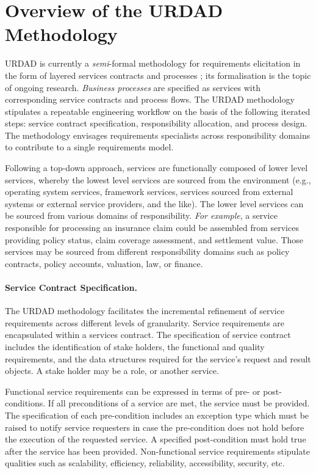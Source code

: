 \section{Overview of the URDAD Methodology 
\label{sec:urdadMethodology}}

URDAD is currently a \emph{semi}-formal methodology for requirements elicitation in the form of layered services contracts and processes  \cite{solms_urdad_2010}; its formalisation is the topic of ongoing research. \emph{Business processes} are specified as services with corresponding service contracts and process flows. The URDAD methodology stipulates a repeatable engineering workflow on the basis of the following iterated steps: service contract specification, responsibility allocation, and process design. The methodology envisages requirements specialists across responsibility domains to contribute to a single requirements model.
 
Following a top-down approach, services are functionally composed of lower level services, whereby the lowest level services are sourced from the environment (e.g., operating system services, framework services, services sourced from external systems or external service providers, and the like). The lower level services can be sourced from various domains of responsibility. \emph{For example}, a service responsible for processing an insurance claim could be assembled from services providing policy status, claim coverage assessment, and settlement value. Those services may be sourced from different responsibility domains such as policy contracts, policy accounts, valuation, law, or finance.

\paragraph{Service Contract Specification.} The URDAD methodology facilitates the incremental refinement of service requirements across different levels of granularity. Service requirements are encapsulated within a services contract. The specification of service contract includes the identification of stake holders, the functional and quality requirements, and the data structures required for the service's request and result objects. A stake holder may be a role, or another service.

Functional service requirements can be expressed in terms of pre- or post-conditions. If all preconditions of a service are met, the service must be provided. The specification of each pre-condition includes an exception type which must be raised to notify service requesters in case the pre-condition does not hold before the execution of the requested service. A specified post-condition must hold true after the service has been provided. Non-functional service requirements stipulate qualities such as scalability, efficiency, reliability, accessibility, security, etc.

